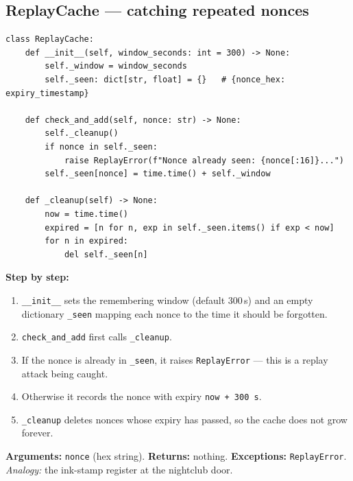\documentclass[11pt,a4paper]{article}
\begin{document}
\subsection{ReplayCache --- catching repeated nonces}
\begin{lstlisting}[style=py,caption={auth\_protocol.py --- the replay cache.}]
class ReplayCache:
    def __init__(self, window_seconds: int = 300) -> None:
        self._window = window_seconds
        self._seen: dict[str, float] = {}   # {nonce_hex: expiry_timestamp}

    def check_and_add(self, nonce: str) -> None:
        self._cleanup()
        if nonce in self._seen:
            raise ReplayError(f"Nonce already seen: {nonce[:16]}...")
        self._seen[nonce] = time.time() + self._window

    def _cleanup(self) -> None:
        now = time.time()
        expired = [n for n, exp in self._seen.items() if exp < now]
        for n in expired:
            del self._seen[n]
\end{lstlisting}
\textbf{Step by step:}
\begin{enumerate}
  \item \texttt{\_\_init\_\_} sets the remembering window (default 300\,s) and an
        empty dictionary \texttt{\_seen} mapping each nonce to the time it should
        be forgotten.
  \item \texttt{check\_and\_add} first calls \texttt{\_cleanup}.
  \item If the nonce is already in \texttt{\_seen}, it raises \texttt{ReplayError}
        --- this is a replay attack being caught.
  \item Otherwise it records the nonce with expiry \texttt{now + 300\,s}.
  \item \texttt{\_cleanup} deletes nonces whose expiry has passed, so the cache
        does not grow forever.
\end{enumerate}
\textbf{Arguments:} \texttt{nonce} (hex string). \textbf{Returns:} nothing.
\textbf{Exceptions:} \texttt{ReplayError}. \emph{Analogy:} the ink-stamp register
at the nightclub door.
\end{document}
